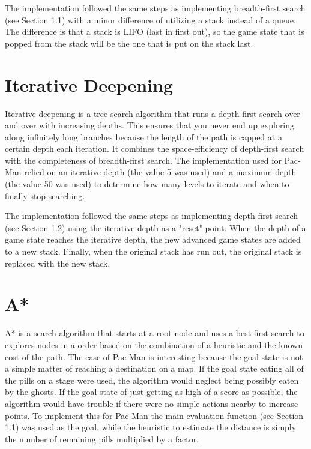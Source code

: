 \documentclass[a4paper,oneside,10pt]{report}
\begin{document}
The implementation followed the same steps as implementing breadth-first search (see Section 1.1) with a minor difference of utilizing a stack instead of a queue. The difference is that a stack is LIFO (last in first out), so the game state that is popped from the stack will be the one that is put on the stack last.

\section{Iterative Deepening}\label{iterative}

Iterative deepening is a tree-search algorithm that runs a depth-first search over and over with increasing depths. This ensures that you never end up exploring along infinitely long branches because the length of the path is capped at a certain depth each iteration. It combines the space-efficiency of depth-first search with the completeness of breadth-first search. The implementation used for Pac-Man relied on an iterative depth (the value 5 was used) and a maximum depth (the value 50 was used) to determine how many levels to iterate and when to finally stop searching.

The implementation followed the same steps as implementing depth-first search (see Section 1.2) using the iterative depth as a "reset" point. When the depth of a game state reaches the iterative depth, the new advanced game states are added to a new stack. Finally, when the original stack has run out, the original stack is replaced with the new stack. 

\section{A*}\label{astar}

A* is a search algorithm that starts at a root node and uses a best-first search to explores nodes in a order based on the combination of a  heuristic and the known cost of the path. The case of Pac-Man is interesting because the goal state is not a simple matter of reaching a destination on a map. If the goal state eating all of the pills on a stage were used, the algorithm would neglect being possibly eaten by the ghosts. If the goal state of just getting as high of a score as possible, the algorithm would have trouble if there were no simple actions nearby to increase points. To implement this for Pac-Man the main evaluation function (see Section 1.1) was used as the goal, while the heuristic to estimate the distance is simply the number of remaining pills multiplied by a factor.
\end{document}
